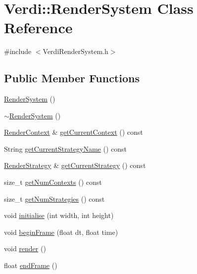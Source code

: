 \hypertarget{class_verdi_1_1_render_system}{\section{\-Verdi\-:\-:\-Render\-System \-Class \-Reference}
\label{class_verdi_1_1_render_system}
}


{\ttfamily \#include $<$\-Verdi\-Render\-System.\-h$>$}

\subsection*{\-Public \-Member \-Functions}
\begin{DoxyCompactItemize}
\item 
\hyperlink{class_verdi_1_1_render_system_afbc4f4b8a7147facbb71911cc6b26b3d}{\-Render\-System} ()
\item 
\hyperlink{class_verdi_1_1_render_system_ad148709131e756573fa247fdf1a60328}{$\sim$\-Render\-System} ()
\item 
\hyperlink{class_verdi_1_1_render_context}{\-Render\-Context} \& \hyperlink{class_verdi_1_1_render_system_ac69fdc36752b1c7b94e5645ccbe2f964}{get\-Current\-Context} () const 
\item 
\-String \hyperlink{class_verdi_1_1_render_system_a7ba69e226efa23cf8833c5e1b5ee20e9}{get\-Current\-Strategy\-Name} () const 
\item 
\hyperlink{class_verdi_1_1_render_strategy}{\-Render\-Strategy} \& \hyperlink{class_verdi_1_1_render_system_ac0edfb2b6f71d565780435a867b2b1bc}{get\-Current\-Strategy} () const 
\item 
size\-\_\-t \hyperlink{class_verdi_1_1_render_system_af6539e58a69184b960f62d7589d9d3ce}{get\-Num\-Contexts} () const 
\item 
size\-\_\-t \hyperlink{class_verdi_1_1_render_system_a8b7f79f2531a7e3424d82f3ec9258dd0}{get\-Num\-Strategies} () const 
\item 
void \hyperlink{class_verdi_1_1_render_system_a63ada7c106625cbf3601ee23300fb8af}{initialise} (int width, int height)
\item 
void \hyperlink{class_verdi_1_1_render_system_a6f613ab81516be249958e099a6073c2e}{begin\-Frame} (float dt, float time)
\item 
void \hyperlink{class_verdi_1_1_render_system_aa1e87321746fdb9fd5ffd6f77b41998f}{render} ()
\item 
float \hyperlink{class_verdi_1_1_render_system_affca7eaa88a20c0bafdb1de505ea8601}{end\-Frame} ()

\end{DoxyCompactItemize}
